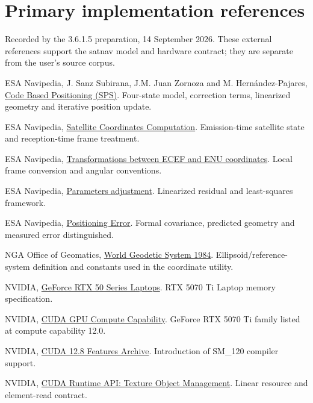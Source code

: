 \documentclass[11pt,a4paper]{article}
\begin{document}
\section*{Primary implementation references}
Recorded by the 3.6.1.5 preparation, 14 September 2026. These external references support the satnav model and
hardware contract; they are separate from the user's source corpus.
\small
\begin{description}[style=nextline,leftmargin=8mm]
\item[G1] ESA Navipedia, J. Sanz Subirana, J.M. Juan Zornoza and M. Hern\'andez-Pajares,
\href{https://gssc.esa.int/navipedia/index.php?title=Code_Based_Positioning_(SPS)}{Code Based Positioning (SPS)}.
Four-state model, correction terms, linearized geometry and iterative position update.
\item[G2] ESA Navipedia, \href{https://gssc.esa.int/navipedia/index.php/Satellite_Coordinates_Computation}{Satellite Coordinates Computation}.
Emission-time satellite state and reception-time frame treatment.
\item[G3] ESA Navipedia, \href{https://gssc.esa.int/navipedia/index.php/Transformations_between_ECEF_and_ENU_coordinates}{Transformations between ECEF and ENU coordinates}.
Local frame conversion and angular conventions.
\item[G4] ESA Navipedia, \href{https://gssc.esa.int/navipedia/index.php?title=Parameters_adjustment}{Parameters adjustment}.
Linearized residual and least-squares framework.
\item[G5] ESA Navipedia, \href{https://gssc.esa.int/navipedia/index.php/Positioning_Error}{Positioning Error}.
Formal covariance, predicted geometry and measured error distinguished.
\item[G6] NGA Office of Geomatics, \href{https://earth-info.nga.mil/index.php?action=wgs84\&dir=wgs84}{World Geodetic System 1984}.
Ellipsoid/reference-system definition and constants used in the coordinate utility.
\item[H1] NVIDIA, \href{https://www.nvidia.com/en-us/geforce/laptops/50-series/}{GeForce RTX 50 Series Laptops}.
RTX 5070 Ti Laptop memory specification.
\item[H2] NVIDIA, \href{https://developer.nvidia.com/cuda/gpus}{CUDA GPU Compute Capability}.
GeForce RTX 5070 Ti family listed at compute capability 12.0.
\item[H3] NVIDIA, \href{https://docs.nvidia.com/cuda/archive/12.8.0/cuda-features-archive/index.html}{CUDA 12.8 Features Archive}.
Introduction of SM\_120 compiler support.
\item[H4] NVIDIA, \href{https://docs.nvidia.com/cuda/cuda-runtime-api/group__CUDART__TEXTURE__OBJECT.html}{CUDA Runtime API: Texture Object Management}.
Linear resource and element-read contract.
\end{description}
\end{document}
